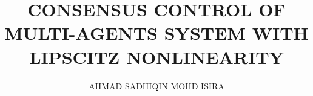 \documentclass[urlsf]{utemclass}
\author{AHMAD SADHIQIN MOHD ISIRA}
\title{CONSENSUS CONTROL OF MULTI-AGENTS SYSTEM WITH LIPSCITZ NONLINEARITY}
\begin{document}
	 
	
	\lstset{fontadjust=true}

	\frontmatter

	\makecover


	\ifpdf
	\else\fi

	\setcounter{page}{0} %
	
	\setcounter{page}{0} %
	
	\setcounter{page}{0}
	
	\setcounter{page}{0}
	
	
	

	
    \newpage
 	

	
	
    
	\renewcommand\contentsname{Table of Contents}
	\newcommand\tocheading{\par\bigskip\MakeUppercase{\chaptername}\hfill Page\par}
	\renewcommand{\listfigurename}{List of Figures}
	\renewcommand{\listtablename}{List of Tables}
		\begin{singlespace}
			\tableofcontents \clearpage
			\listoftables \clearpage
			\listoffigures \clearpage
			
		\end{singlespace}
		
\end{document}
